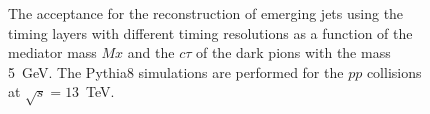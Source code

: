\begin{figure}
\begin{center}

\end{center}
\caption{
The acceptance for the reconstruction of emerging jets using the timing layers with different timing resolutions as
a function of the mediator mass $Mx$ and the $c\tau$ of the dark pions with the mass 5~GeV.
The Pythia8 simulations are performed
for the $pp$ collisions at $\sqrt{s}=13$~TeV. 
}
\label{fig:efficiency_med}
\end{figure}



